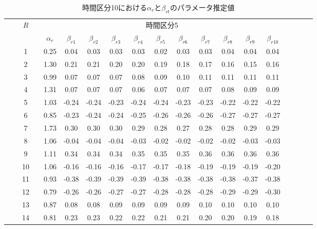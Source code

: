 \documentclass[a4paper,11pt,oneside,openany]{jsbook}
\newcommand{\bhline}[1]{\noalign{\hrule height #1}}
\begin{document}
\begin{table}[h!]
\begin{center}
\caption{時間区分10における$\alpha_r$と$\beta_{rt}の$パラメータ推定値}
\setlength{\tabcolsep}{5.pt}
\begin{tabular}{ccccccccccccccccccc}  
\bhline{1pt}
& & \multirow{2}{*}{$R$} & & \multicolumn{11}{c}{時間区分5}     \\
\cline{5-15}
  & &  & & $\alpha_r$ & $\beta_{r1}$ & $\beta_{r2}$ & $\beta_{r3}$ & $\beta_{r4}$ & $\beta_{r5}$ & $\beta_{r6}$ & $\beta_{r7}$ & $\beta_{r8}$ & $\beta_{r9}$ & $\beta_{r10}$ \\
\bhline{1pt}
 &  & 1  &  & 0.25 & 0.04  & 0.03  & 0.03  & 0.03  & 0.02  & 0.03  & 0.03  & 0.04  & 0.04  & 0.04  \\
 &  & 2  &  & 1.30 & 0.21  & 0.21  & 0.20  & 0.20  & 0.19  & 0.18  & 0.17  & 0.16  & 0.15  & 0.16  \\
 &  & 3  &  & 0.99 & 0.07  & 0.07  & 0.07  & 0.08  & 0.09  & 0.10  & 0.11  & 0.11  & 0.11  & 0.11  \\
 &  & 4  &  & 1.31 & 0.07  & 0.07  & 0.07  & 0.06  & 0.07  & 0.07  & 0.07  & 0.08  & 0.09  & 0.09  \\
 &  & 5  &  & 1.03 & -0.24 & -0.24 & -0.23 & -0.24 & -0.24 & -0.23 & -0.23 & -0.22 & -0.22 & -0.22 \\
 &  & 6  &  & 0.85 & -0.23 & -0.24 & -0.24 & -0.25 & -0.26 & -0.26 & -0.26 & -0.27 & -0.27 & -0.27 \\
 &  & 7  &  & 1.73 & 0.30  & 0.30  & 0.30  & 0.29  & 0.28  & 0.27  & 0.28  & 0.28  & 0.29  & 0.29  \\
 &  & 8  &  & 1.06 & -0.04 & -0.04 & -0.04 & -0.03 & -0.02 & -0.02 & -0.02 & -0.02 & -0.03 & -0.03 \\
 &  & 9  &  & 1.11 & 0.34  & 0.34  & 0.34  & 0.35  & 0.35  & 0.35  & 0.36  & 0.36  & 0.36  & 0.36  \\
 &  & 10 &  & 1.06 & -0.16 & -0.16 & -0.16 & -0.17 & -0.17 & -0.18 & -0.19 & -0.19 & -0.19 & -0.20 \\
 &  & 11 &  & 0.93 & -0.38 & -0.39 & -0.39 & -0.39 & -0.38 & -0.38 & -0.38 & -0.38 & -0.37 & -0.38 \\
 &  & 12 &  & 0.79 & -0.26 & -0.26 & -0.27 & -0.27 & -0.28 & -0.28 & -0.28 & -0.29 & -0.29 & -0.30 \\
 &  & 13 &  & 0.87 & 0.08  & 0.08  & 0.09  & 0.09  & 0.09  & 0.09  & 0.10  & 0.10  & 0.10  & 0.10  \\
 &  & 14 &  & 0.81 & 0.23  & 0.23  & 0.22  & 0.22  & 0.21  & 0.21  & 0.20  & 0.20  & 0.19  & 0.18  \\

\end{tabular}
\end{center}
\end{table}
\end{document}
